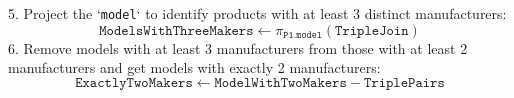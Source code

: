 \documentclass{article}
\begin{document}
5. Project the `\texttt{model}` to identify products with at least 3 distinct manufacturers:
$$
    \texttt{ModelsWithThreeMakers} \leftarrow \pi_{\texttt{P1.model}}(\texttt{TripleJoin})
$$
6. Remove models with at least 3 manufacturers from those with at least 2 manufacturers and get models with exactly 2 manufacturers:
$$
    \texttt{ExactlyTwoMakers} \leftarrow \texttt{ModelWithTwoMakers} - \texttt{TriplePairs}
$$
\end{document}

